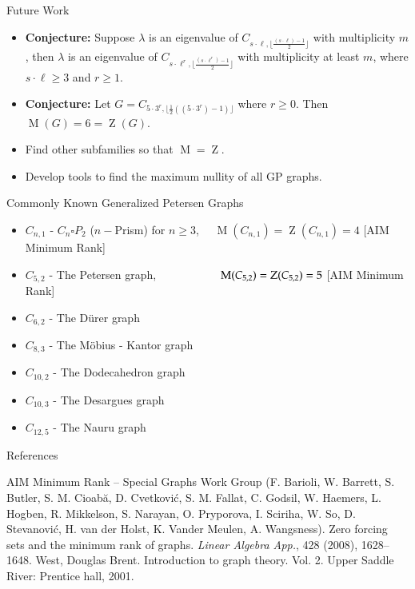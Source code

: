 \documentclass[final]{beamer}
\newcommand{\M}{\operatorname{M}}
\newcommand{\Z}{\operatorname{Z}}
\newcommand{\bit}{\begin{itemize}}
\newcommand{\eit}{\end{itemize}}
\begin{document}
\begin{frame}{}
\begin{columns}[t]
\begin{column}{0.38 \linewidth}
\begin{block}{Future Work}
\bit
\item {\bf Conjecture:} Suppose $\lambda$ is an eigenvalue of $C_{s\cdot \ell, \lfloor \frac{(s \cdot \ell) - 1}{2} \rfloor }$ with multiplicity $m$, then $\lambda$ is an eigenvalue of $C_{s \cdot \ell^r, \lfloor \frac{(s \cdot \ell^r) - 1}{2} \rfloor}$ with multiplicity at least $m$, where $s \cdot \ell \geq 3$ and $r \geq 1$.
\item {\bf Conjecture:} Let $G =  C_{5\cdot 3^r, \lfloor \frac{1}{2}((5\cdot3^r)-1) \rfloor}$ where $r \geq 0$. Then $\M(G) = 6 = \Z(G)$. 
\item Find other subfamilies so that $\M = \Z$. 
\item Develop tools to find the maximum nullity of all GP graphs.
\eit
\end{block}

\begin{block}{Commonly Known Generalized Petersen Graphs}
\bit
\item $C_{n,1}$ -  $C_n \square P_2$ ($n-$Prism) for $n \geq 3$, $\quad\M(C_{n,1}) = \Z(C_{n,1}) = 4$ [AIM Minimum Rank]
\item $C_{5,2}$ - The Petersen graph,  $\hspace{1.9cm} \M(C_{5,2}) = \Z(C_{5,2}) = 5$ [AIM Minimum Rank]
\item $C_{6,2}$ - The  D\"{u}rer  graph 
\item $C_{8,3}$ - The M\"{o}bius - Kantor graph 
\item $C_{10,2}$ - The Dodecahedron graph 
\item $C_{10,3}$ - The Desargues graph  
\item $C_{12,5}$ - The Nauru graph
\eit
\end{block}
        
\begin{block}{References}
\begin{thebibliography}{20}
      
 AIM Minimum Rank -- Special Graphs Work Group (F. Barioli, W. Barrett, S. Butler, S. M. Cioab\u{a}, D. Cvetkovi\'c, S. M. Fallat, C. Godsil, W. Haemers, L. Hogben,  R. Mikkelson,  S. Narayan,  O. Pryporova,   I. Sciriha,  W. So,   D. Stevanovi\'c,  H. van der Holst, K. Vander Meulen,  A. Wangsness).  Zero forcing sets and the minimum rank  of graphs.   {\em Linear Algebra App.}, 428 (2008),  1628--1648.
 West, Douglas Brent. Introduction to graph theory. Vol. 2. Upper Saddle River: Prentice hall, 2001.
\end{thebibliography}
\end{block}

\end{column}%

\end{columns}

\end{frame}
\end{document}
